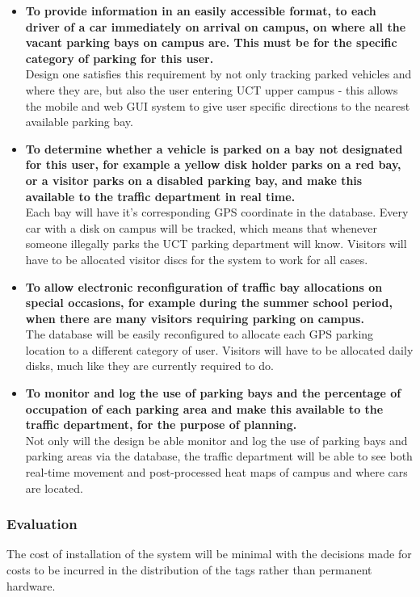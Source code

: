 \begin{itemize}
\item \textbf{To provide information in an easily accessible format, to each driver of a car immediately on arrival on campus, on where all the vacant parking bays on campus are. This must be for the specific category of parking for this user.}\\
Design one satisfies this requirement by not only tracking parked vehicles and where they are, but also the user entering UCT upper campus - this allows the mobile and web GUI system to give user specific directions to the nearest available parking bay.

\item \textbf{To determine whether a vehicle is parked on a bay not designated for this user, for example a yellow disk holder parks on a red bay, or a visitor parks on a disabled parking bay, and make this available to the traffic department in real time.}\\
Each bay will have it's corresponding GPS coordinate in the database. Every car with a disk on campus will be tracked, which means that whenever someone illegally parks the UCT parking department will know. Visitors will have to be allocated visitor discs for the system to work for all cases.

\item \textbf{To allow electronic reconfiguration  of  traffic  bay allocations on special occasions, for example during the summer school period, when there are many visitors requiring parking on campus.}\\
The database will be easily reconfigured to allocate each GPS parking location to a different category of user. Visitors will have to be allocated daily disks, much like they are currently required to do.

\item \textbf{To monitor and log the use of parking bays and the percentage of occupation of each parking area and make this available to the traffic department, for the purpose of planning.}\\
Not only will the design be able monitor and log the use of parking bays and parking areas via the database, the traffic department will be able to see both real-time movement and post-processed heat maps of campus and where cars are located.
\end{itemize}

\subsubsection{Evaluation}
The cost of installation of the system will be minimal with the decisions made for costs to be incurred in the distribution of the tags rather than permanent hardware.

